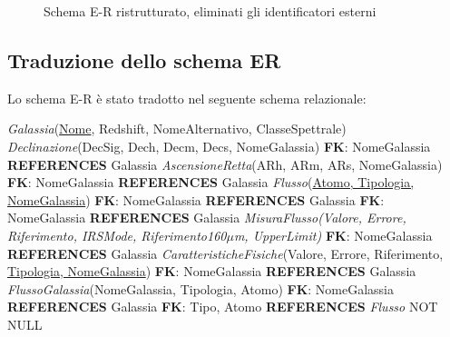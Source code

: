 \documentclass[12pt,a4paper,onecolumn,x11names]{article}
\begin{document}
\begin{figure}[h]
{
			}
			\caption{Schema E-R ristrutturato, eliminati gli identificatori esterni}
		\end{figure}
\newpage

\subsection{Traduzione dello schema ER}

	\begin{flushleft}
		Lo schema E-R è stato tradotto nel seguente schema relazionale:
		
		\textsf{\textit{Galassia}(\underline{Nome}, Redshift, NomeAlternativo, ClasseSpettrale)}\newline
		\textsf{\textit{Declinazione}(DecSig, Dech, Decm, Decs, NomeGalassia)}\newline
		\textsf{\textbf{FK}: NomeGalassia \textbf{REFERENCES} Galassia}\newline
		\textsf{\textit{AscensioneRetta}(ARh, ARm, ARs, NomeGalassia)}\newline
		\textsf{\textbf{FK}: NomeGalassia \textbf{REFERENCES} Galassia}\newline
		\textsf{\textit{Flusso}(\underline{Atomo, Tipologia, NomeGalassia})}\newline
		\textsf{\textbf{FK}: NomeGalassia \textbf{REFERENCES} Galassia}\newline
		\textsf{\textbf{FK}: NomeGalassia \textbf{REFERENCES} Galassia}\newline
		\textsf{\textit{MisuraFlusso(Valore, Errore, Riferimento, IRSMode, Riferimento160$\mu$m, UpperLimit)}}\newline
		\textsf{\textbf{FK}: NomeGalassia \textbf{REFERENCES} Galassia}\newline
		\textsf{\textit{CaratteristicheFisiche}(Valore, Errore, Riferimento, \underline{Tipologia, NomeGalassia})}\newline
		\textsf{\textbf{FK}: NomeGalassia \textbf{REFERENCES} Galassia}\newline\newline		
		\textsf{\textit{FlussoGalassia}(NomeGalassia, Tipologia, Atomo)}\newline
		\textsf{\textbf{FK}: NomeGalassia \textbf{REFERENCES} Galassia}\newline
		\textsf{\textbf{FK}: Tipo, Atomo \textbf{REFERENCES} \textit{Flusso} NOT NULL}
	\end{flushleft}
\end{document}

